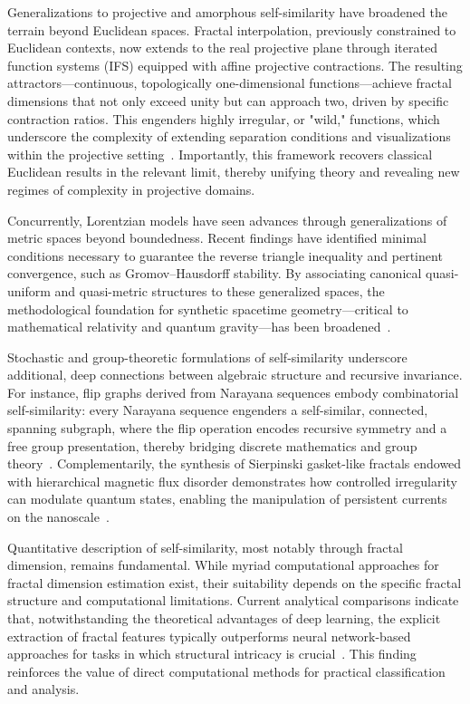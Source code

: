 \documentclass[11pt]{article}
\begin{document}
Generalizations to projective and amorphous self-similarity have broadened the terrain beyond Euclidean spaces. Fractal interpolation, previously constrained to Euclidean contexts, now extends to the real projective plane through iterated function systems (IFS) equipped with affine projective contractions. The resulting attractors—continuous, topologically one-dimensional functions—achieve fractal dimensions that not only exceed unity but can approach two, driven by specific contraction ratios. This engenders highly irregular, or "wild," functions, which underscore the complexity of extending separation conditions and visualizations within the projective setting~\cite{ref30}. Importantly, this framework recovers classical Euclidean results in the relevant limit, thereby unifying theory and revealing new regimes of complexity in projective domains.

Concurrently, Lorentzian models have seen advances through generalizations of metric spaces beyond boundedness. Recent findings have identified minimal conditions necessary to guarantee the reverse triangle inequality and pertinent convergence, such as Gromov--Hausdorff stability. By associating canonical quasi-uniform and quasi-metric structures to these generalized spaces, the methodological foundation for synthetic spacetime geometry—critical to mathematical relativity and quantum gravity—has been broadened~\cite{ref33}.

Stochastic and group-theoretic formulations of self-similarity underscore additional, deep connections between algebraic structure and recursive invariance. For instance, flip graphs derived from Narayana sequences embody combinatorial self-similarity: every Narayana sequence engenders a self-similar, connected, spanning subgraph, where the flip operation encodes recursive symmetry and a free group presentation, thereby bridging discrete mathematics and group theory~\cite{ref42}. Complementarily, the synthesis of Sierpinski gasket-like fractals endowed with hierarchical magnetic flux disorder demonstrates how controlled irregularity can modulate quantum states, enabling the manipulation of persistent currents on the nanoscale~\cite{ref51}.

Quantitative description of self-similarity, most notably through fractal dimension, remains fundamental. While myriad computational approaches for fractal dimension estimation exist, their suitability depends on the specific fractal structure and computational limitations. Current analytical comparisons indicate that, notwithstanding the theoretical advantages of deep learning, the explicit extraction of fractal features typically outperforms neural network-based approaches for tasks in which structural intricacy is crucial~\cite{ref37}. This finding reinforces the value of direct computational methods for practical classification and analysis.
\end{document}
